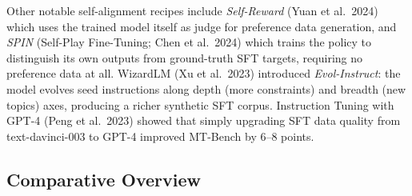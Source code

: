 Other notable self-alignment recipes include \emph{Self-Reward} (Yuan et al.~2024) which uses the trained model itself as judge for preference data generation, and \emph{SPIN} (Self-Play Fine-Tuning; Chen et al.~2024) which trains the policy to distinguish its own outputs from ground-truth SFT targets, requiring no preference data at all. WizardLM (Xu et al.~2023) introduced \emph{Evol-Instruct}: the model evolves seed instructions along depth (more constraints) and breadth (new topics) axes, producing a richer synthetic SFT corpus. Instruction Tuning with GPT-4 (Peng et al.~2023) showed that simply upgrading SFT data quality from text-davinci-003 to GPT-4 improved MT-Bench by 6--8 points.

\subsection{Comparative Overview}\label{comparative-overview}

